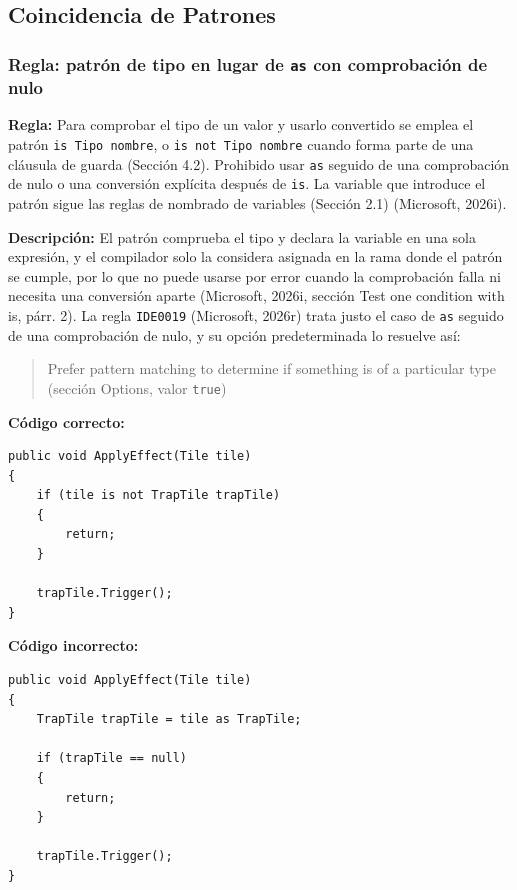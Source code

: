 \subsection{Coincidencia de Patrones}

\subsubsection{Regla: patrón de tipo en lugar de \texttt{as} con comprobación de nulo}

\textbf{Regla:} Para comprobar el tipo de un valor y usarlo convertido se emplea el patrón \texttt{is Tipo nombre}, o \texttt{is not Tipo nombre} cuando forma parte de una cláusula de guarda (Sección 4.2). Prohibido usar \texttt{as} seguido de una comprobación de nulo o una conversión explícita después de \texttt{is}. La variable que introduce el patrón sigue las reglas de nombrado de variables (Sección 2.1) (Microsoft, 2026i).

\textbf{Descripción:} El patrón comprueba el tipo y declara la variable en una sola expresión, y el compilador solo la considera asignada en la rama donde el patrón se cumple, por lo que no puede usarse por error cuando la comprobación falla ni necesita una conversión aparte (Microsoft, 2026i, sección Test one condition with is, párr. 2). La regla \texttt{IDE0019} (Microsoft, 2026r) trata justo el caso de \texttt{as} seguido de una comprobación de nulo, y su opción predeterminada lo resuelve así:
\begin{quote}
Prefer pattern matching to determine if something is of a particular type (sección Options, valor \texttt{true})
\end{quote}

\textbf{Código correcto:}
\begin{lstlisting}[style=csharpstyle]
public void ApplyEffect(Tile tile)
{
    if (tile is not TrapTile trapTile)
    {
        return;
    }

    trapTile.Trigger();
}
\end{lstlisting}

\textbf{Código incorrecto:}
\begin{lstlisting}[style=csharpstyle]
public void ApplyEffect(Tile tile)
{
    TrapTile trapTile = tile as TrapTile;

    if (trapTile == null)
    {
        return;
    }

    trapTile.Trigger();
}
\end{lstlisting}
